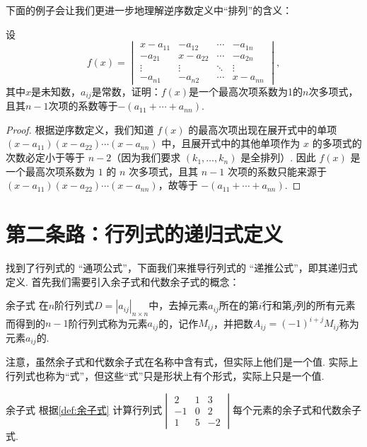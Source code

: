 下面的例子会让我们更进一步地理解逆序数定义中``排列''的含义：
\begin{example}{}{}
    设
    \[f(x)=\begin{vmatrix}
            x-a_{11} & -a_{12}  & \cdots & -a_{1n}  \\
            -a_{21}  & x-a_{22} & \cdots & -a_{2n}  \\
            \vdots   & \vdots   & \ddots & \vdots   \\
            -a_{n1}  & -a_{n2}  & \cdots & x-a_{nn}
        \end{vmatrix},\]
    其中$x$是未知数，$a_{ij}$是常数，证明：$f(x)$是一个最高次项系数为1的$n$次多项式，且其$n-1$次项的系数等于$-(a_{11}+\cdots+a_{nn})$.
\end{example}

\begin{proof}
    根据逆序数定义，我们知道 $f(x)$ 的最高次项出现在展开式中的单项 $(x-a_{11})(x-a_{22})\cdots(x-a_{nn})$ 中，且展开式中的其他单项作为 $x$ 的多项式的次数必定小于等于 $n-2$（因为我们要求 $(k_1,\ldots,k_n)$ 是全排列）. 因此 $f(x)$ 是一个最高次项系数为 $1$ 的 $n$ 次多项式，且其 $n-1$ 次项的系数只能来源于 $(x-a_{11})(x-a_{22})\cdots(x-a_{nn})$，故等于 $-(a_{11}+\cdots+a_{nn})$.
\end{proof}

\section{第二条路：行列式的递归式定义}

找到了行列式的 ``通项公式''，下面我们来推导行列式的 ``递推公式''，即其递归式定义. 首先我们需要引入余子式和代数余子式的概念：

\begin{definition}{}{余子式}
    在$n$阶行列式$D=|a_{ij}|_{n \times n}$中，去掉元素$a_{ij}$所在的第$i$行和第$j$列的所有元素而得到的$n-1$阶行列式称为元素$a_{ij}$的，记作$M_{ij}$，并把数$A_{ij}=(-1)^{i+j}M_{ij}$称为元素$a_{ij}$的.
\end{definition}

注意，虽然余子式和代数余子式在名称中含有式，但实际上他们是一个值. 实际上行列式也称为``式''，但这些``式''只是形状上有个形式，实际上只是一个值.
\begin{example}{}{余子式}
    根据\autoref{def:余子式} 计算行列式$\begin{vmatrix}
            2  & 1 & 3  \\
            -1 & 0 & 2  \\
            1  & 5 & -2
        \end{vmatrix}$每个元素的余子式和代数余子式.
\end{example}

